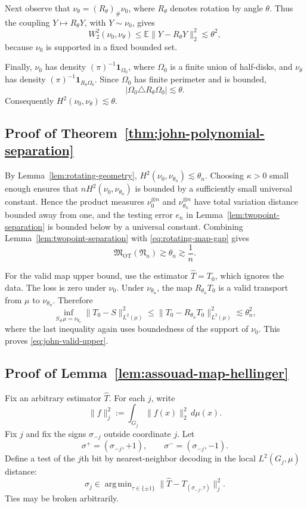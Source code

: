 \documentclass[11pt,twoside]{article}
\DeclareMathOperator*{\argmin}{arg\,min}
\newcommand{\targetclass}{\mathfrak{N}}
\newcommand{\otminimaxrisk}{\mathfrak{M}_{\text{OT}}}
\begin{document}
Next observe that $\nu_\theta=(R_\theta)_\#\nu_0$, where $R_\theta$ denotes rotation by angle $\theta$. Thus the coupling $Y\mapsto R_\theta Y$, with $Y\sim\nu_0$, gives
\[
W_2^2(\nu_0,\nu_\theta)
\leq
\mathbb E\|Y-R_\theta Y\|_2^2
\lesssim
\theta^2,
\]
because $\nu_0$ is supported in a fixed bounded set.

Finally, $\nu_0$ has density $(\pi)^{-1}\mathbf 1_{\Omega_0}$, where $\Omega_0$ is a finite union of half-disks, and $\nu_\theta$ has density $(\pi)^{-1}\mathbf 1_{R_\theta\Omega_0}$. Since $\Omega_0$ has finite perimeter and is bounded,
\[
|\Omega_0\triangle R_\theta\Omega_0|\lesssim\theta.
\]
Consequently $H^2(\nu_0,\nu_\theta)\lesssim \theta$.

\subsection{Proof of Theorem~\ref{thm:john-polynomial-separation}}
By Lemma~\ref{lem:rotating-geometry}, $H^2(\nu_0,\nu_{\theta_n})\lesssim\theta_n$. Choosing $\kappa>0$ small enough ensures that $nH^2(\nu_0,\nu_{\theta_n})$ is bounded by a sufficiently small universal constant. Hence the product measures $\nu_0^{\otimes n}$ and $\nu_{\theta_n}^{\otimes n}$ have total variation distance bounded away from one, and the testing error $e_n$ in Lemma~\ref{lem:twopoint-separation} is bounded below by a universal constant. Combining Lemma~\ref{lem:twopoint-separation} with \eqref{eq:rotating-map-gap} gives
\[
\otminimaxrisk(\targetclass_n)
\gtrsim
\theta_n
\gtrsim
\frac{1}{n}.
\]

For the valid map upper bound, use the estimator $\widehat T=T_0$, which ignores the data. The loss is zero under $\nu_0$. Under $\nu_{\theta_n}$, the map $R_{\theta_n}T_0$ is a valid transport from $\mu$ to $\nu_{\theta_n}$. Therefore
\[
\inf_{S_\#\mu=\nu_{\theta_n}}
\|T_0-S\|_{L^2(\mu)}^2
\leq
\|T_0-R_{\theta_n}T_0\|_{L^2(\mu)}^2
\lesssim
\theta_n^2,
\]
where the last inequality again uses boundedness of the support of $\nu_0$. This proves \eqref{eq:john-valid-upper}.

\subsection{Proof of Lemma~\ref{lem:assouad-map-hellinger}}
Fix an arbitrary estimator $\widehat T$. For each $j$, write
\[
\|f\|_{j}^{2}
:=
\int_{G_j}\|f(x)\|_2^2\,d\mu(x).
\]
Fix $j$ and fix the signs $\sigma_{-j}$ outside coordinate $j$. Let
\[
\sigma^+=(\sigma_{-j},+1),
\qquad
\sigma^-=(\sigma_{-j},-1).
\]
Define a test of the $j$th bit by nearest-neighbor decoding in the local
$L^2(G_j,\mu)$ distance:
\[
\widehat \sigma_j
\in
\argmin_{\tau\in\{\pm1\}}
\|\widehat T-T_{(\sigma_{-j},\tau)}\|_j^2 .
\]
Ties may be broken arbitrarily.
\end{document}
